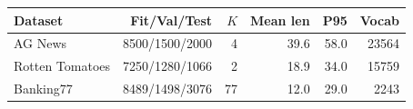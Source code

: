 \begin{tabular}{@{}lrrrrr@{}}
\toprule
Dataset & Fit/Val/Test & $K$ & Mean len & P95 & Vocab \\
\midrule
AG News & 8500/1500/2000 & 4 & 39.6 & 58.0 & 23564 \\
Rotten Tomatoes & 7250/1280/1066 & 2 & 18.9 & 34.0 & 15759 \\
Banking77 & 8489/1498/3076 & 77 & 12.0 & 29.0 & 2243 \\
\bottomrule
\end{tabular}
